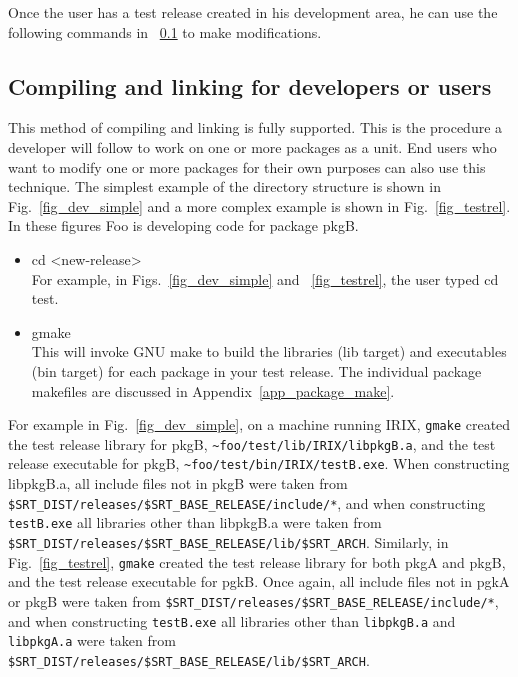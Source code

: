 \documentclass[12pt]{article}
\begin{document}
Once the user has a test release created in his development area, he
can use the following commands in ~\ref{sec_debug}  to make modifications. 

\subsection{Compiling and linking for developers or users}
\label{sec_debug}

This method of compiling and linking is fully supported.
This is the procedure a developer will follow to work on one or more packages
as a unit.  End users who want to modify one or more packages for their own
purposes can also use this technique. The simplest example of the directory
structure is shown in Fig.~\ref{fig_dev_simple} and a more complex example is 
shown in Fig.~\ref{fig_testrel}.  In these figures Foo is developing code
for package {\ttfamily pkgB}.
\begin{itemize}

\item {\ttfamily cd <new-release>} \\
For example, in Figs.~\ref{fig_dev_simple} and ~\ref{fig_testrel},
the user typed {\ttfamily cd test}.

\item {\ttfamily gmake}\\
This will invoke GNU make to build the libraries (lib target) and 
executables (bin target) for each package in your test release. 
The individual package makefiles are discussed in
Appendix~\ref{app_package_make}. 
\end{itemize}

\begin{sloppypar}
For example in Fig.~\ref{fig_dev_simple}, on a machine running IRIX, \texttt{gmake} 
created the test release library for pkgB, \verb|~foo/test/lib/IRIX/libpkgB.a|, 
and the test release executable for pkgB, \verb|~foo/test/bin/IRIX/testB.exe|. When
constructing libpkgB.a, all include files not in pkgB were taken from 
\texttt{\$SRT\_DIST/releases/\$SRT\_BASE\_RELEASE/include/*}, and when constructing 
\verb|testB.exe| all libraries other
than libpkgB.a were taken from 
\texttt{\$SRT\_DIST/releases/\$SRT\_BASE\_RELEASE/lib/\$SRT\_ARCH}.  Similarly, in
Fig.~\ref{fig_testrel}, \texttt{gmake} created the test release library for
both pkgA and pkgB, and the test release executable for pgkB.  Once again,
all include files not in pgkA or pkgB were taken from 
\texttt{\$SRT\_DIST/releases/\$SRT\_BASE\_RELEASE/include/*}, and when constructing 
\texttt{testB.exe} all libraries other
than \texttt{libpkgB.a} and \texttt{libpkgA.a} were taken from 
\texttt{\$SRT\_DIST/releases/\$SRT\_BASE\_RELEASE/lib/\$SRT\_ARCH}.
\end{sloppypar}
\end{document}
